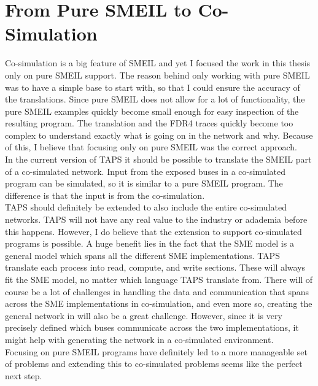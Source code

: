 \section{From Pure SMEIL to Co-Simulation}
Co-simulation is a big feature of SMEIL and yet I focused the work in this thesis only on pure SMEIL support. The reason behind only working with pure SMEIL was to have a simple base to start with, so that I could ensure the accuracy of the translations. Since pure SMEIL does not allow for a lot of functionality, the pure SMEIL examples quickly become small enough for easy inspection of the resulting \cspm{} program.
The translation and the FDR4 traces quickly become too complex to understand exactly what is going on in the network and why. Because of this, I believe that focusing only on pure SMEIL was the correct approach.\\

In the current version of TAPS it should be possible to translate the SMEIL part of a co-simulated network. Input from the exposed buses in a co-simulated program can be simulated, so it is similar to a pure SMEIL program. The difference is that the input is from the co-simulation.\\

TAPS should definitely be extended to also include the entire co-simulated networks. TAPS will not have any real value to the industry or adademia before this happens. However, I do believe that the extension to support co-simulated programs is possible. A huge benefit lies in the fact that the SME model is a general model which spans all the different SME implementations. TAPS translate each process into read, compute, and write sections. These will always fit the SME model, no matter which language TAPS translate from.
There will of course be a lot of challenges in handling the data and communication that spans across the SME implementations in co-simulation, and even more so, creating the general network in \cspm{} will also be a great challenge. However, since it is very precisely defined which buses communicate across the two implementations, it might help with generating the \cspm{} network in a co-simulated environment.\\

Focusing on pure SMEIL programs have definitely led to a more manageable set of problems and extending this to co-simulated problems seems like the perfect next step.


